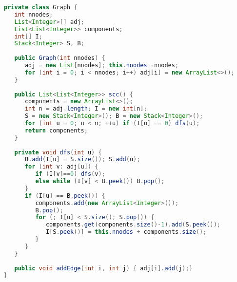 \begin{lstlisting}[language=Java]
private class Graph {
   int nnodes;
   List<Integer>[] adj;
   List<List<Integer>> components;
   int[] I;
   Stack<Integer> S, B;
	
   public Graph(int nnodes) {
      adj = new List[nnodes]; this.nnodes =nnodes;
      for (int i = 0; i < nnodes; i++) adj[i] = new ArrayList<>();
   }
	
   public List<List<Integer>> scc() {
      components = new ArrayList<>(); 
      int n = adj.length; I = new int[n];
      S = new Stack<Integer>(); B = new Stack<Integer>();
      for (int u = 0; u < n; ++u) if (I[u] == 0) dfs(u);
      return components;
   }
	
   private void dfs(int u) {
      B.add(I[u] = S.size()); S.add(u);
      for (int v: adj[u]) {
         if (I[v]==0) dfs(v);
         else while (I[v] < B.peek()) B.pop();
      }
      if (I[u] == B.peek()) {
         components.add(new ArrayList<Integer>());
         B.pop();
         for (; I[u] < S.size(); S.pop()) {
            components.get(components.size()-1).add(S.peek());
            I[S.peek()] = this.nnodes + components.size();
         }
      }
   }
	
   public void addEdge(int i, int j) { adj[i].add(j);}
}
\end{lstlisting}
